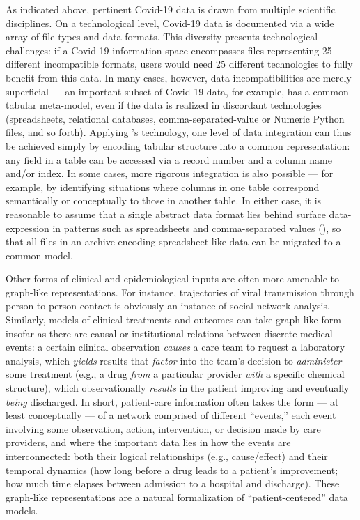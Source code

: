 \documentclass[11pt,letterpaper]{article}
\newcommand{\ATextCClr}[1]{\textcolor{atcColor}{\textbf{#1}}}
\newcommand{\CRtwo}{{\resizebox{!}{7.5pt}{\ATextCClr{CR2}}}}
\newcommand{\textscc}[1]{{\color{orr!35!black}{{%
						\fontfamily{Cabin-TLF}\fontseries{b}\selectfont{\textsc{\scriptsize{#1}}}}}}}
\newcommand{\AcronymText}[1]{{\textscc{#1}}}
\newcommand{\CSV}{{\resizebox{!}{7pt}{\AcronymText{CSV}}}}
\newcommand{\p}[1]{

\vspace{1.2em}#1}
\newcommand{\q}[1]{{\fontfamily{qcr}\selectfont ``}#1{\fontfamily{qcr}\selectfont ''}}
\begin{document}
{\p{As indicated above, pertinent Covid-19 data is drawn 
from multiple scientific disciplines.  On a technological level, 
Covid-19 data is documented via a wide array of file 
types and data formats.  This diversity presents technological 
challenges: if a Covid-19 information space encompasses 
files representing 25 different incompatible 
formats, users would need 25 different technologies 
to fully benefit from this data.  In many 
cases, however, data incompatibilities are 
merely superficial --- an important subset of 
Covid-19 data, for example, has a common 
tabular meta-model, even if the data is 
realized in discordant technologies (spreadsheets, 
relational databases, comma-separated-value or 
Numeric Python files, and so forth).  Applying \CRtwo{}'s technology, 
one level of data integration can thus 
be achieved simply by encoding tabular 
structure into a common representation: any field in a table 
can be accessed via a record number and a column name and/or 
index.  In some cases, more rigorous integration is also 
possible --- for example, by identifying situations where 
columns in one table correspond semantically or conceptually 
to those in another table.  In either case, 
it is reasonable to assume that a single abstract data 
format lies behind surface data-expression in patterns 
such as spreadsheets and comma-separated values 
(\CSV{}), so that all files in an 
archive encoding spreadsheet-like data can be 
migrated to a common model.}

\p{Other forms of clinical and epidemiological inputs are often 
more amenable to graph-like representations.  For instance, 
trajectories of viral transmission through 
person-to-person contact is obviously an instance 
of social network analysis.  Similarly, models of 
clinical treatments and outcomes can take graph-like 
form insofar as there are causal or institutional 
relations between discrete medical events: 
a certain clinical observation \textit{causes} a 
care team to request a laboratory analysis, 
which \textit{yields} results that \textit{factor} 
into the team's decision to \textit{administer} some 
treatment (e.g., a drug \textit{from} a particular 
provider \textit{with} a specific chemical structure), which 
observationally \textit{results} in the patient improving 
and eventually \textit{being} discharged.  In short, 
patient-care information often takes the form 
--- at least conceptually --- of a network comprised 
of different \q{events,} each event involving some 
observation, action, intervention, or decision made 
by care providers, and where the important data 
lies in how the events are interconnected: both their 
logical relationships (e.g., cause/effect) and their 
temporal dynamics (how long before a drug leads to a 
patient's improvement; how much time elapses between admission to 
a hospital and discharge).  These graph-like representations 
are a natural formalization of \q{patient-centered} data 
models.}

}
\end{document}
